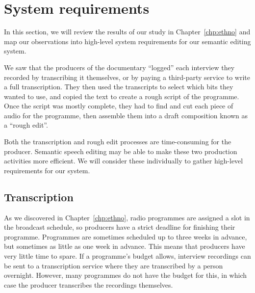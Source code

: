 
\section{System requirements}\label{sec:screen-requirements}


In this section, we will review the results of our study in Chapter~\ref{chp:ethno} and map our observations into
high-level system requirements for our semantic editing system.

We saw that the producers of the documentary ``logged'' each interview they recorded by transcribing it themselves, or
by paying a third-party service to write a full transcription.  They then used the transcripts to select which bits
they wanted to use, and copied the text to create a rough script of the programme. Once the script was mostly complete,
they had to find and cut each piece of audio for the programme, then assemble them into a draft composition known as a
``rough edit''.

Both the transcription and rough edit processes are time-consuming for the producer. Semantic speech
editing may be able to make these two production activities more efficient. We will consider these
individually to gather high-level requirements for our system.

\subsection{Transcription}
As we discovered in Chapter~\ref{chp:ethno}, radio programmes are assigned a slot in the broadcast schedule, so
producers have a strict deadline for finishing their programme. Programmes are sometimes scheduled up to three
weeks in advance, but sometimes as little as one week in advance.  This means that producers have very little time to
spare. If a programme's budget allows, interview recordings can be sent to a transcription service where they are
transcribed by a person overnight. However, many programmes do not have the budget for this, in which case the producer
transcribes the recordings themselves.


